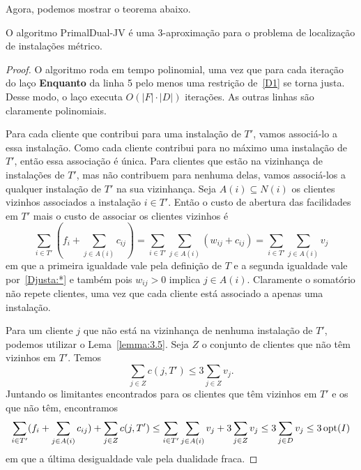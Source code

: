 Agora, podemos mostrar o teorema abaixo.
\begin{theorem}
    O algoritmo {\sc PrimalDual-JV} é uma $3$-aproximação para o problema de localização de instalações métrico.
\end{theorem}
\begin{proof}
    O algoritmo roda em tempo polinomial, uma vez que para cada iteração do laço {\bf Enquanto} da linha 5 pelo menos uma restrição de~\eqref{D1} se torna justa. Desse modo, o laço executa $O(|F| \cdot |D|)$ iterações. As outras linhas são claramente polinomiais.

    Para cada cliente que contribui para uma instalação de $T'$, vamos associá-lo a essa instalação. Como cada cliente contribui para no máximo uma instalação de $T'$, então essa associação é única. Para clientes que estão na vizinhança de instalações de $T'$, mas não contribuem para nenhuma delas, vamos associá-los a qualquer instalação de $T'$ na sua vizinhança.
    Seja $A(i) \subseteq N(i)$ os clientes vizinhos associados a instalação $i \in T'$. Então o custo de abertura das facilidades em $T'$ mais o custo de associar os clientes vizinhos é
    \[\sum_{i \in T'} (f_i + \sum_{j \in A(i)} c_{ij}) = \sum_{i \in T'} \sum_{j \in A(i)} (w_{ij} + c_{ij}) = \sum_{i \in T'} \sum_{j \in A(i)} v_j\]
    em que a primeira igualdade vale pela definição de $T$ e a segunda igualdade vale por~\eqref{Djusta:*} e também pois $w_{ij} > 0$ implica $j \in A(i)$. Claramente o somatório não repete clientes, uma vez que cada cliente está associado a apenas uma instalação.

    Para um cliente $j$ que não está na vizinhança de nenhuma instalação de $T'$, podemos utilizar o Lema~\ref{lemma:3.5}. Seja $Z$ o conjunto de clientes que não têm vizinhos em $T'$. Temos
    \[\sum_{j \in Z}c(j,T') \leq 3\sum_{j \in Z}v_j.\]
    Juntando os limitantes encontrados para os clientes que têm vizinhos em $T'$ e os que não têm, encontramos
    \[\sum_{i \in T'} (f_i + \sum_{j \in A(i)} c_{ij}) + \sum_{j \in Z} c(j,T')\leq \sum_{i \in T'} \sum_{j \in A(i)} v_j + 3 \sum_{j \in Z} v_j \leq 3 \sum_{j \in D} v_j\leq 3\,\mathrm{opt}(I)\]
    em que a última desigualdade vale pela dualidade fraca.
\end{proof}
